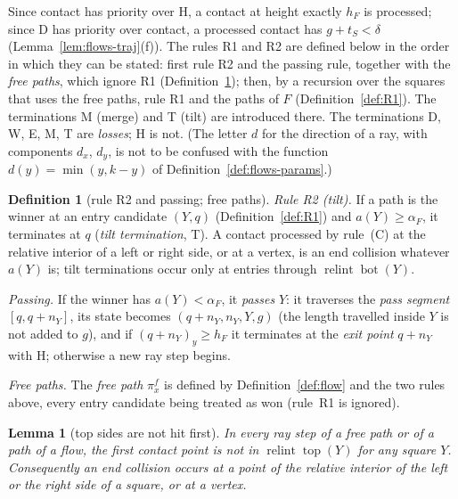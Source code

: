 \documentclass[11pt]{amsart}
\newcommand{\relint}{\operatorname{relint}}
\newcommand{\Bot}{\operatorname{bot}}
\newcommand{\Top}{\operatorname{top}}
\newtheorem{lemma}[theorem]{Lemma}
\theoremstyle{definition}
\newtheorem{definition}[theorem]{Definition}
\theoremstyle{remark}
\numberwithin{equation}{section}
\begin{document}
Since contact has priority over H, a contact at height exactly $h_F$ is processed; since D has priority over contact,
a processed contact has $g+t_S<\delta$ (Lemma~\ref{lem:flows-traj}(f)). The rules R1 and R2 are defined below in the
order in which they can be stated: first rule R2 and the passing rule, together with the \emph{free paths}, which ignore
R1 (Definition~\ref{def:R2}); then, by a recursion over the squares that uses the free paths, rule R1 and the paths of
$F$ (Definition~\ref{def:R1}). The terminations M (merge) and T (tilt) are introduced there. The terminations D, W, E,
M, T are \emph{losses}; H is not. (The letter $d$ for the direction of a ray, with components $d_x$, $d_y$, is not to
be confused with the function $d(y)=\min(y,k-y)$ of Definition~\ref{def:flows-params}.)

\begin{definition}[rule R2 and passing; free paths]\label{def:R2}
\emph{Rule R2 (tilt).} If a path is the winner at an entry candidate $(Y,q)$ (Definition~\ref{def:R1}) and
$a(Y)\ge\alpha_F$, it terminates at $q$ (\emph{tilt termination}, T). A contact processed by rule~(C) at the relative
interior of a left or right side, or at a vertex, is an end collision whatever $a(Y)$ is; tilt terminations occur only
at entries through $\relint\Bot(Y)$.

\emph{Passing.} If the winner has $a(Y)<\alpha_F$, it \emph{passes} $Y$: it traverses the \emph{pass segment}
$[q,q+n_Y]$, its state becomes $(q+n_Y,n_Y,Y,g)$ (the length travelled inside $Y$ is not added to $g$), and if
$(q+n_Y)_y\ge h_F$ it terminates at the \emph{exit point} $q+n_Y$ with H; otherwise a new ray step begins.

\emph{Free paths.} The \emph{free path} $\pi^f_x$ is defined by Definition~\ref{def:flow} and the two rules above,
every entry candidate being treated as won (rule~R1 is ignored).
\end{definition}

\begin{lemma}[top sides are not hit first]\label{lem:flows-top}
In every ray step of a free path or of a path of a flow, the first contact point is not in $\relint\Top(Y)$ for any
square $Y$. Consequently an end collision occurs at a point of the relative interior of the left or the right side of
a square, or at a vertex.
\end{lemma}
\end{document}
